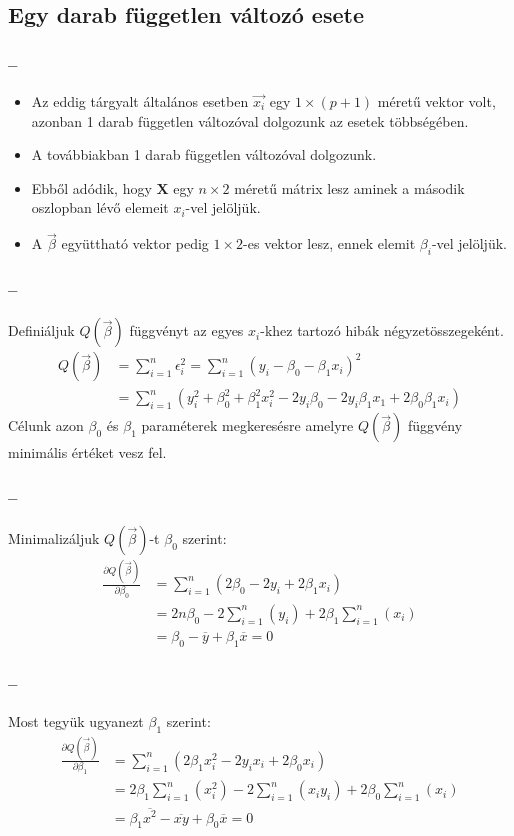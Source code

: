 \documentclass [aspectratio=169]{beamer}
\newcommand{\titten}{\secname{} -- \subsecname}
\begin{document}
\subsection{Egy darab független változó esete}
\begin{frame}
\frametitle{\titten}
\begin{itemize}
\item Az eddig tárgyalt általános esetben $\vec{x_i}$ egy $1\times (p+1)$ méretű vektor volt, azonban 1 darab független változóval dolgozunk az esetek többségében.
\item A továbbiakban 1 darab független változóval dolgozunk.
\item Ebből adódik, hogy $\mathbf{X}$ egy $n\times 2$ méretű mátrix lesz aminek a második oszlopban lévő elemeit $x_i$-vel jelöljük.
\item A $\vec{\beta}$ együttható vektor pedig $1\times 2$-es vektor lesz, ennek elemit $\beta_i$-vel jelöljük.
\end{itemize}
\end{frame}
\begin{frame}
\frametitle{\titten}
Definiáljuk $Q(\vec{\beta})$ függvényt az egyes $x_i$-khez tartozó hibák négyzetösszegeként.
\begin{align*}
Q(\vec{\beta})&=\sum^n_{i=1}\epsilon_i^2=\sum^n_{i=1}(y_i-\beta_0-\beta_1x_i)^2\\
&=\sum^n_{i=1}(y_i^2+\beta_0^2+\beta_1^2x_i^2-2y_i\beta_0-2y_i\beta_1x_1+2\beta_0\beta_1x_i)
\end{align*}
Célunk azon $\beta_0$ és $\beta_1$ paraméterek megkeresésre amelyre $Q(\vec{\beta})$ függvény minimális értéket vesz fel.
\end{frame}
\begin{frame}
\frametitle{\titten}
Minimalizáljuk $Q(\vec{\beta})$-t $\beta_0$ szerint:
\begin{align*}
\frac{\partial Q(\vec{\beta})}{\partial\beta_0}&=\sum_{i=1}^n(2\beta_0-2y_i+2\beta_1x_i)\\
&=2n\beta_0-2\sum_{i=1}^n(y_i)+2\beta_1\sum_{i=1}^n(x_i)\\
&=\beta_0-\overline{y}+\beta_1\overline{x}=0
\end{align*}
\end{frame}
\begin{frame}
\frametitle{\titten}
Most tegyük ugyanezt $\beta_1$ szerint:
\begin{align*}
\frac{\partial Q(\vec{\beta})}{\partial\beta_1}&=\sum_{i=1}^n(2\beta_1x_i^2-2y_ix_i+2\beta_0x_i)\\
&=2\beta_1\sum_{i=1}^n(x_i^2)-2\sum_{i=1}^n(x_iy_i)+2\beta_0\sum_{i=1}^n(x_i)\\
&=\beta_1\overline{x^2}-\overline{xy}+\beta_0\overline{x}=0
\end{align*}
\end{frame}
\end{document}

